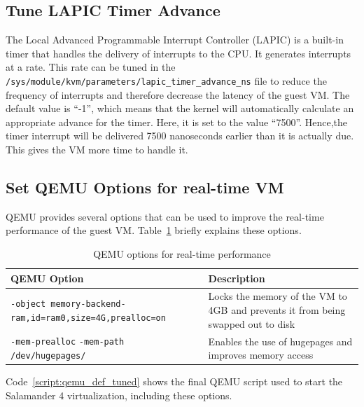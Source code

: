 \documentclass[MMR,Master,english]{twbook}
\begin{document}
\subsection{Tune LAPIC Timer Advance}
The Local Advanced Programmable Interrupt Controller (LAPIC) is a built-in timer that handles the delivery of interrupts to the CPU.
It generates interrupts at a rate. This rate can be tuned in the \texttt{/sys/module/kvm/parameters/lapic\_timer\_advance\_ns} file to reduce the frequency of interrupts and therefore decrease the latency of the guest VM. The default value is ``-1'', which means that the kernel will automatically calculate an appropriate advance for the timer. Here, it is set to the value ``7500''. Hence,the timer interrupt will be delivered 7500 nanoseconds earlier than it is actually due. This gives the VM more time to handle it.

\subsection{Set QEMU Options for real-time VM}
QEMU provides several options that can be used to improve the real-time performance of the guest VM. Table~\ref{tab:qemu_options} briefly explains these options.

\begin{table}[H]
	\centering
	\caption{QEMU options for real-time performance}
	\label{tab:qemu_options}
	\setlength{\tabcolsep}{0.5em} %
	{\renewcommand{\arraystretch}{1.2}%
		\begin{tabular}{|p{6.5cm}|p{8cm}|}
			\hline
			\textbf{QEMU Option}                                                             & \textbf{Description}                                                             \\\hline
			\texttt{-object memory-backend-ram,}\newline\texttt{id=ram0,size=4G,prealloc=on} & Locks the memory of the VM to 4GB and prevents it from being swapped out to disk \\\hline
			\texttt{-mem-prealloc} \newline \texttt{-mem-path /dev/hugepages/}               & Enables the use of hugepages and improves \newline memory access                 \\\hline
		\end{tabular}}
\end{table}

\noindent Code~\ref{script:qemu_def_tuned} shows the final QEMU script used to start the Salamander 4 virtualization, including these options.
\end{document}
